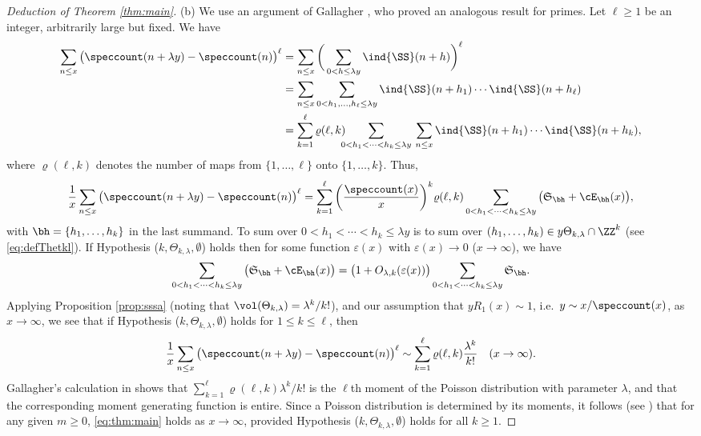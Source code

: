 \documentclass[12pt, reqno, twoside, letterpaper]{amsart}
\begin{document}
\begin{proof}[Deduction of Theorem \ref{thm:main}]
(b)
%
We use an argument of Gallagher \cite{GAL:76}, who proved an 
analogous result for primes.
%
Let $\ell \ge 1$ be an integer, arbitrarily large but fixed.
%
We have   
\begin{align*}
  \sum_{n \le x}
   \big(\speccount(n + \lambda y) - \speccount(n) \big)^{\ell}
  & =
     \sum_{n \le x}
      \bigg(\sum_{0 < h \le \lambda y} \ind{\SS}(n + h)\bigg)^{\ell}
 \\
  & = 
     \sum_{n \le x}
      \sum_{0 < h_1,\ldots,h_{\ell} \le \lambda y} \ind{\SS}(n + h_1)\cdots \ind{\SS}(n + h_{\ell})
 \\
  & =
       \sum_{k = 1}^{\ell}
        \varrho(\ell,k)
         \hspace{-5.8pt}
         \sum_{0 < h_1 < \cdots < h_k \le \lambda y}
          \hspace{2pt}
           \sum_{n \le x}
            \ind{\SS}(n + h_1)\cdots \ind{\SS}(n + h_k),
\end{align*}
where $\varrho(\ell,k)$ denotes the number of maps from 
$\{1,\ldots,\ell\}$ onto $\{1,\ldots,k\}$.
%
Thus,  
\[
 \frac{1}{x}
  \sum_{n \le x}
   \big(\speccount(n + \lambda y) - \speccount(n) \big)^{\ell}
  =
    \sum_{k = 1}^{\ell}
     \bigg(\frac{\speccount(x)}{x}\bigg)^k
      \varrho(\ell,k)
       \sum_{0 < h_1 < \cdots < h_k \le \lambda y} 
        \big(\mathfrak{S}_{\bh} + \cE_{\bh}(x)\big),
\]
with $\bh = \{h_1,\ldots,h_k\}$ in the last summand.
%
To sum over $0 < h_1 < \cdots < h_k \le \lambda y$ is to sum over 
$(h_1,\ldots,h_k) \in y\Theta_{k,\lambda} \cap \ZZ^k$ (see 
\eqref{eq:defThetkl}).
%
If Hypothesis ($k,\Theta_{k,\lambda},\emptyset$) holds then for 
some function $\varepsilon(x)$ with $\varepsilon(x) \to 0$ 
($x \to \infty$), we have  
\[
 \sum_{0 < h_1 < \cdots < h_k \le \lambda y} 
  \big(\mathfrak{S}_{\bh} + \cE_{\bh}(x)\big)
   =
    \big(1 + O_{\lambda,k}(\varepsilon(x))\big)
     \sum_{0 < h_1 < \cdots < h_k \le \lambda y} \mathfrak{S}_{\bh}.
\]
%
Applying Proposition \ref{prop:sssa} (noting that 
$\vol(\Theta_{k,\lambda}) = \lambda^k/k!$), and our assumption 
that $yR_1(x) \sim 1$, i.e.\ $y \sim x/\speccount(x)$, as 
$x \to \infty$, we see that if 
Hypothesis ($k,\Theta_{k,\lambda},\emptyset$) holds for 
$1 \le k \le \ell$, then 
\begin{equation}
 \label{eq:ellthmoment}
 \frac{1}{x}
  \sum_{n \le x}
   \big(\speccount(n + \lambda y) - \speccount(n) \big)^{\ell}
    \sim 
     \sum_{k = 1}^{\ell}
      \varrho(\ell,k)
       \frac{\lambda^k}{k!} 
        \quad 
      (x \to \infty).
\end{equation}
%
Gallagher's calculation in \cite[Section 3]{GAL:76} shows that 
$
 \sum_{k = 1}^{\ell} \varrho(\ell,k)\lambda^k/k!
$
is the $\ell$th moment of the Poisson distribution with parameter 
$\lambda$, and that the corresponding moment generating function 
is entire.
%
Since a Poisson distribution is determined by its moments, it 
follows (see \cite[Section 30]{BIL:95}) that for any given 
$m \ge 0$, \eqref{eq:thm:main} holds as $x \to \infty$, provided 
Hypothesis ($k,\Theta_{k,\lambda},\emptyset$) holds for all 
$k \ge 1$.
%
\end{proof}
\end{document}
